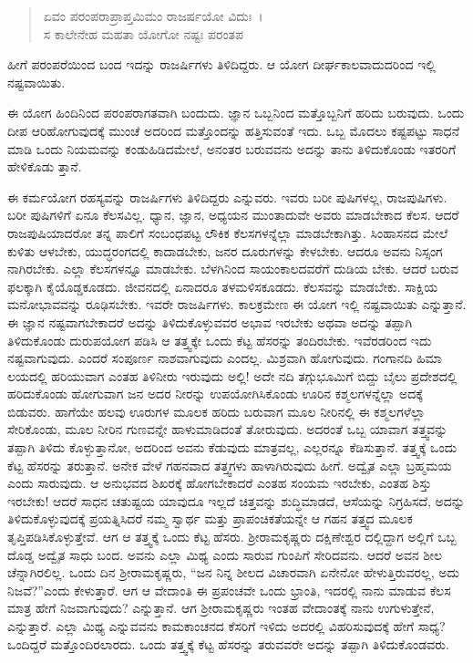 \begin{verse}
ಏವಂ ಪರಂಪರಾಪ್ರಾಪ್ತಮಿಮಂ ರಾಜರ್ಷಯೋ ವಿದುಃ~।\\ಸ ಕಾಲೇನೇಹ ಮಹತಾ ಯೋಗೋ ನಷ್ಟಃ ಪರಂತಪ 
\end{verse}

{\small ಹೀಗೆ ಪರಂಪರೆಯಿಂದ ಬಂದ ಇದನ್ನು ರಾಜರ್ಷಿಗಳು ತಿಳಿದಿದ್ದರು. ಆ ಯೋಗ ದೀರ್ಘಕಾಲವಾದುದರಿಂದ ಇಲ್ಲಿ ನಷ್ಟವಾಯಿತು.}

ಈ ಯೋಗ ಹಿಂದಿನಿಂದ ಪರಂಪರಾಗತವಾಗಿ ಬಂದುದು. ಜ್ಞಾನ ಒಬ್ಬನಿಂದ ಮತ್ತೊಬ್ಬನಿಗೆ ಹರಿದು ಬರುವುದು. ಒಂದು ದೀಪ ಆರಿಹೋಗುವುದಕ್ಕೆ ಮುಂಚೆ ಅದರಿಂದ ಮತ್ತೊಂದನ್ನು ಹತ್ತಿಸುವಂತೆ ಇದು. ಒಬ್ಬ ಮೊದಲು ಕಷ್ಟಪಟ್ಟು ಸಾಧನೆ ಮಾಡಿ ಒಂದು ನಿಯಮವನ್ನು ಕಂಡುಹಿಡಿದಮೇಲೆ, ಅನಂತರ ಬರುವವನು ಅದನ್ನು ತಾನು ತಿಳಿದುಕೊಂಡು ಇತರರಿಗೆ ಹೇಳಿಕೊಡು ತ್ತಾನೆ.

ಈ ಕರ್ಮಯೋಗ ರಹಸ್ಯವನ್ನು ರಾಜರ್ಷಿಗಳು ತಿಳಿದಿದ್ದರು ಎನ್ನುವರು. ಇವರು ಬರೀ ಪುಷಿಗಳಲ್ಲ, ರಾಜಪುಷಿಗಳು. ಬರೀ ಪುಷಿಗಳಿಗೆ ಏನೂ ಕೆಲಸವಿಲ್ಲ. ಧ್ಯಾನ, ಜ್ಞಾನ, ಅಧ್ಯಯನ ಮುಂತಾದುವೇ ಅವರು ಮಾಡಬೇಕಾದ ಕೆಲಸ. ಆದರೆ ರಾಜಪುಷಿಯಾದರೋ ತನ್ನ ಪಾಲಿಗೆ ಸಂಬಂಧಪಟ್ಟ ಲೌಕಿಕ ಕೆಲಸಗಳನ್ನೆಲ್ಲಾ ಮಾಡಬೇಕಾಗಿತ್ತು. ಸಿಂಹಾಸನದ ಮೇಲೆ ಕುಳಿತು ಆಳಬೇಕು, ಯುದ್ಧರಂಗದಲ್ಲಿ ಕಾದಾಡಬೇಕು, ಜನರ ದೂರುಗಳನ್ನು ಕೇಳಬೇಕು. ಆದರೂ ಅವನು ನಿಸ್ಸಂಗ ನಾಗಿರಬೇಕು. ಎಲ್ಲಾ ಕೆಲಸಗಳನ್ನೂ ಮಾಡಬೇಕು. ಬೆಳಗಿನಿಂದ ಸಾಯಂಕಾಲದವರೆಗೆ ದುಡಿಯ ಬೇಕು. ಆದರೆ ಬರುವ ಫಲಕ್ಕಾಗಿ ಕೈಯೊಡ್ಡಕೂಡದು. ಜೀವನದಲ್ಲಿ ಏನಾದರೂ ತಳಮಳಿಸಕೂಡದು. ಕೆಲಸವನ್ನು ಮಾಡಬೇಕು. ಸಾಕ್ಷಿಯ ಮನೋಭಾವವನ್ನು ರೂಢಿಸಬೇಕು. ಇವರೇ ರಾಜರ್ಷಿಗಳು. ಕಾಲಕ್ರಮೇಣ ಈ ಯೋಗ ಇಲ್ಲಿ ನಷ್ಟವಾಯಿತು ಎನ್ನುತ್ತಾನೆ. ಈ ಜ್ಞಾನ ನಷ್ಟವಾಗಬೇಕಾದರೆ ಅದನ್ನು ತಿಳಿದುಕೊಳ್ಳುವವರ ಅಭಾವ ಇರಬೇಕು ಅಥವಾ ಅದನ್ನು ತಪ್ಪಾಗಿ ತಿಳಿದುಕೊಂಡು ದುರುಪಯೋಗ ಪಡಿಸಿ ಆ ತತ್ತ್ವಕ್ಕೇ ಒಂದು ಕೆಟ್ಟ ಹೆಸರನ್ನು ತಂದಿರಬೇಕು. ಇವೆರಡರಿಂದ ಇದು ನಷ್ಟವಾಗುವುದು. ಎಂದರೆ ಸಂಪೂರ್ಣ ನಾಶವಾಗುವುದು ಎಂದಲ್ಲ. ಮಿಶ್ರವಾಗಿ ಹೋಗುವುದು. ಗಂಗಾನದಿ ಹಿಮಾ ಲಯದಲ್ಲಿ ಹರಿಯುವಾಗ ಎಂತಹ ತಿಳಿನೀರು ಇರುವುದು ಅಲ್ಲಿ! ಅದೇ ನದಿ ತಗ್ಗುಭೂಮಿಗೆ ಬಿದ್ದು ಬೈಲು ಪ್ರದೇಶದಲ್ಲಿ ಹರಿದುಕೊಂಡು ಹೋಗುವಾಗ ಜನ ಅದರ ನೀರನ್ನು ಉಪಯೋಗಿಸಿಕೊಂಡು ಊರಿನ ಕಶ್ಮಲಗಳನ್ನೆಲ್ಲಾ ಅದಕ್ಕೆ ಬಿಡುವರು. ಹಾಗೆಯೇ ಹಲವು ಊರುಗಳ ಮೂಲಕ ಹರಿದು ಬರುವಾಗ ಮೂಲ ನೀರಿನಲ್ಲಿ ಈ ಕಶ್ಮಲಗಳೆಲ್ಲಾ ಸೇರಿಕೊಂಡು, ಮೂಲ ನೀರಿನ ಗುಣವನ್ನೇ ಹಾಳುಮಾಡಿದಂತೆ ತೋರುವುದು. ಅದರಂತೆ ಒಬ್ಬ ಯಾವಾಗ ತತ್ತ್ವವನ್ನು ತಪ್ಪಾಗಿ ತಿಳಿದು ಕೊಳ್ಳುತ್ತಾನೋ, ಅದರಿಂದ ಅವನು ಕೆಡುವುದು ಮಾತ್ರವಲ್ಲ, ಎಲ್ಲರನ್ನೂ ಕೆಡಿಸುತ್ತಾನೆ. ತತ್ತ್ವಕ್ಕೆ ಒಂದು ಕೆಟ್ಟ ಹೆಸರನ್ನು ತರುತ್ತಾನೆ. ಅನೇಕ ವೇಳೆ ಗಹನವಾದ ತತ್ತ್ವಗಳು ಹಾಳಾಗಿರುವುದು ಹೀಗೆ. ಅದ್ವೈತ ಎಲ್ಲಾ ಬ್ರಹ್ಮಮಯ ಎಂದು ಸಾರುವುದು. ಆ ಅನುಭವದ ಶಿಖರಕ್ಕೆ ಹೋಗಬೇಕಾದರೆ ಎಂತಹ ಸಂಯಮ ಇರಬೇಕು, ಎಂತಹ ಶಿಸ್ತು ಇರಬೇಕು! ಆದರೆ ಸಾಧನ ಚತುಷ್ಟಯ ಯಾವುದೂ ಇಲ್ಲದೆ ಚಿತ್ತವನ್ನು ಶುದ್ಧಿಮಾಡದೆ, ಆಸೆಯನ್ನು ನಿಗ್ರಹಿಸದೆ, ಅದನ್ನು ತಿಳಿದುಕೊಳ್ಳುವುದಕ್ಕೆ ಪ್ರಯತ್ನಿಸಿದರೆ ನಮ್ಮ ಸ್ವಾರ್ಥ ಮತ್ತು ಪ್ರಾಪಂಚಿಕತೆಯನ್ನೇ ಆ ಗಹನ ತತ್ತ್ವದ ಮೂಲಕ ತೃಪ್ತಿಪಡಿಸಿಕೊಳ್ಳುತ್ತೇವೆ. ಆಗ ಆ ತತ್ತ್ವಕ್ಕೆ ಒಂದು ಕೆಟ್ಟ ಹೆಸರು. ಶ‍್ರೀರಾಮಕೃಷ್ಣರು ದಕ್ಷಿಣೇಶ್ವರ ದಲ್ಲಿದ್ದಾಗ ಅಲ್ಲಿಗೆ ಒಬ್ಬ ದೊಡ್ಡ ಅದ್ವೈತ ಸಾಧು ಬಂದ. ಅವನು ಎಲ್ಲಾ ಮಿಥ್ಯ ಎಂದು ಸಾರುವ ಗುಂಪಿಗೆ ಸೇರಿದವನು. ಆದರೆ ಅವನ ಶೀಲ ಚೆನ್ನಾಗಿರಲಿಲ್ಲ. ಒಂದು ದಿನ ಶ‍್ರೀರಾಮಕೃಷ್ಣರು, “ಜನ ನಿನ್ನ ಶೀಲದ ವಿಚಾರವಾಗಿ ಏನೇನೋ ಹೇಳುತ್ತಿರುವರಲ್ಲ, ಅದು ನಿಜವೆ?”ಎಂದು ಕೇಳುತ್ತಾರೆ. ಆಗ ಆ ವೇದಾಂತಿ ಈ ಪ್ರಪಂಚವೇ ಒಂದು ಭ್ರಾಂತಿ, ಇದರಲ್ಲಿ ನಾನು ಮಾಡುವ ಕೆಲಸ ಮಾತ್ರ ಹೇಗೆ ನಿಜವಾಗುವುದು? ಎನ್ನುತ್ತಾನೆ. ಆಗ ಶ‍್ರೀರಾಮಕೃಷ್ಣರು ಇಂತಹ ವೇದಾಂತಕ್ಕೆ ನಾನು ಉಗುಳುತ್ತೇನೆ, ಎನ್ನುತ್ತಾರೆ. ಎಲ್ಲಾ ಮಿಥ್ಯ ಎನ್ನುವವನು ಕಾಮಕಾಂಚನದ ಕೆಸರಿಗೆ ಇಳಿದು ಅದರಲ್ಲಿ ವಿಹರಿಸುವುದಕ್ಕೆ ಹೇಗೆ ಸಾಧ್ಯ? ಒಂದಿದ್ದರೆ ಮತ್ತೊಂದಿರಲಾರದು. ಒಂದು ತತ್ತ್ವಕ್ಕೆ ಕೆಟ್ಟ ಹೆಸರನ್ನು ತರುವವರೇ ಅದನ್ನು ತಪ್ಪಾಗಿ ತಿಳಿದುಕೊಂಡವರು.

